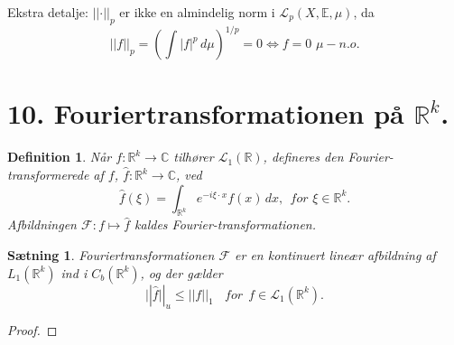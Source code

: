 \documentclass[12pt]{report}
\newtheorem{theorem}[lemma]{Sætning}
\newtheorem{definition}[lemma]{Definition}
\theoremstyle{break}
\newtheorem*{proof}{Bevis}
\theoremstyle{break}
\newcommand{\Int}[1]{\int#1\,d\mu}
\newcommand{\RR}{\mathbb{R}}
\newcommand{\EE}{\mathbb{E}}
\newcommand{\FI}{\mathcal{F}}
\renewcommand{\L}{\mathcal{L}}
\newcommand{\laengde}[1]{\lvert|#1\rvert|}
\begin{document}
\bigskip

Ekstra detalje: $\laengde{\cdot}_p$ er ikke en almindelig norm i $\L_p(X,\EE,\mu)$, da
\[\laengde{f}_p=\left(\Int{|f|^p}\right)^{1/p} = 0\Leftrightarrow f=0\,\,\mu-n.o.\]


\newpage
\section*{10. Fouriertransformationen på $\RR^k$.}
\begin{definition}
Når $f\colon\RR^k\to\mathbb{C}$ tilhører $\L_1(\RR)$, defineres den Fourier-transformerede af $f$, $\hat{f}\colon\RR^k\to\mathbb{C}$, ved 
\[\hat{f}(\xi) = \int_{\RR^k}e^{-i\xi\cdot x}f(x)\,dx,~~for\,\,\xi\in\RR^k.\]
Afbildningen $\FI\colon f\mapsto\hat{f}$ kaldes Fourier-transformationen.
\end{definition}
\begin{theorem}
Fouriertransformationen $\FI$ er en kontinuert lineær afbildning af $L_1(\RR^k)$ ind i $C_b(\RR^k)$, og der gælder
\[\laengde{\hat{f}}_u\leq\laengde{f}_1~~~~for~~f\in\L_1(\RR^k).\]
\end{theorem}
\begin{proof}

\end{proof}
\end{document}

